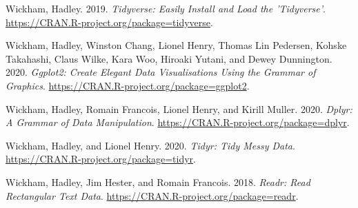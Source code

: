 \documentclass[
  12pt,
]{krantz}
\newlength{\cslhangindent}
\newenvironment{cslreferences}%
  {\setlength{\parindent}{0pt}%
  \everypar{\setlength{\hangindent}{\cslhangindent}}\ignorespaces}%
  {\par}
\begin{document}
\begin{cslreferences}
\leavevmode\hypertarget{ref-R-tidyverse}{}%
Wickham, Hadley. 2019. \emph{Tidyverse: Easily Install and Load the 'Tidyverse'}. \url{https://CRAN.R-project.org/package=tidyverse}.

\leavevmode\hypertarget{ref-R-ggplot2}{}%
Wickham, Hadley, Winston Chang, Lionel Henry, Thomas Lin Pedersen, Kohske Takahashi, Claus Wilke, Kara Woo, Hiroaki Yutani, and Dewey Dunnington. 2020. \emph{Ggplot2: Create Elegant Data Visualisations Using the Grammar of Graphics}. \url{https://CRAN.R-project.org/package=ggplot2}.

\leavevmode\hypertarget{ref-R-dplyr}{}%
Wickham, Hadley, Romain Francois, Lionel Henry, and Kirill Muller. 2020. \emph{Dplyr: A Grammar of Data Manipulation}. \url{https://CRAN.R-project.org/package=dplyr}.

\leavevmode\hypertarget{ref-R-tidyr}{}%
Wickham, Hadley, and Lionel Henry. 2020. \emph{Tidyr: Tidy Messy Data}. \url{https://CRAN.R-project.org/package=tidyr}.

\leavevmode\hypertarget{ref-R-readr}{}%
Wickham, Hadley, Jim Hester, and Romain Francois. 2018. \emph{Readr: Read Rectangular Text Data}. \url{https://CRAN.R-project.org/package=readr}.
\end{cslreferences}
\end{document}
